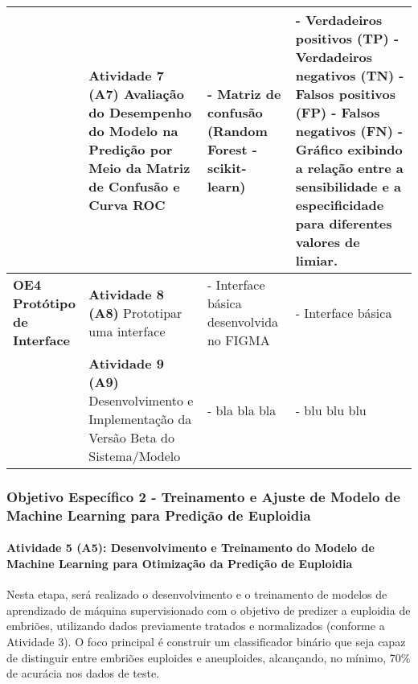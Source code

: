 \begin{table}[h!]
{\begin{tabular}{|p{3cm}|p{4cm}|p{3cm}|p{5cm}|}
      & 
      \textcolor[HTML]{133E78}{\textbf{Atividade 7 (A7)}} \newline
      Avaliação do Desempenho do Modelo na Predição por Meio da Matriz de Confusão e Curva ROC &
      - Matriz de confusão (Random Forest - scikit-learn) &
      - Verdadeiros positivos (TP) \newline
      - Verdadeiros negativos (TN) \newline
      - Falsos positivos (FP) \newline
      - Falsos negativos (FN) \newline
      - Gráfico exibindo a relação entre a sensibilidade e a especificidade para diferentes valores de limiar. \\
      \hline

      \parbox[c]{\linewidth}{
        \vspace{0.2cm}
        \centering
        \textcolor[HTML]{133E78}{\textbf{
          OE4 \\[0.1cm]
          Protótipo de \\[0.1cm]
          Interface
        }}
      }
      & 
      \textcolor[HTML]{133E78}{\textbf{Atividade 8 (A8)}} \newline
      Prototipar uma interface &
      - Interface básica desenvolvida no FIGMA &
      - Interface básica \\
      \hline
      &
      \textcolor[HTML]{133E78}{\textbf{Atividade 9 (A9)}} \newline
      Desenvolvimento e Implementação da Versão Beta do Sistema/Modelo &
      - bla bla bla &
      - blu blu blu \\
      \hline
    \end{tabular}
  }
\end{table}
\FloatBarrier


\subsubsection{\textbf{Objetivo Específico 2} - Treinamento e Ajuste de Modelo de Machine Learning para Predição de Euploidia}

\paragraph{\textbf{Atividade 5 (A5):} Desenvolvimento e Treinamento do Modelo de Machine Learning para Otimização da Predição de Euploidia}

Nesta etapa, será realizado o desenvolvimento e o treinamento de modelos de aprendizado de máquina supervisionado com o objetivo de predizer a euploidia de embriões, utilizando dados previamente tratados e normalizados (conforme a Atividade 3). O foco principal é construir um classificador binário que seja capaz de distinguir entre embriões euploides e aneuploides, alcançando, no mínimo, 70\% de acurácia nos dados de teste. 


